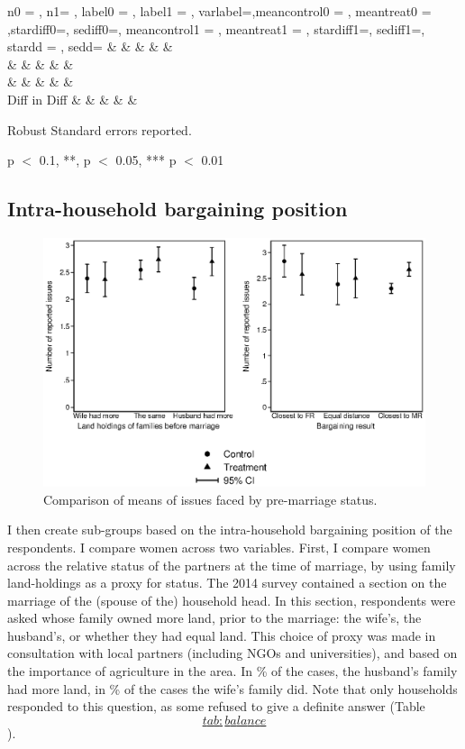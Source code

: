 \documentclass[
]{article}
\begin{document}
n0 = , n1= , label0 = , label1 = , varlabel=,meancontrol0 = , meantreat0
= ,stardiff0=, sediff0=, meancontrol1 = , meantreat1 = , stardiff1=,
sediff1=, stardd = , sedd= \& \& \& \& \&\\
\& \& \& \& \&\\
\& \& \& \& \&\\
Diff in Diff \& \& \& \& \&

Robust Standard errors reported.

p \(<\) 0.1, **, p \(<\) 0.05, *** p \(<\) 0.01

\subsection*{Intra-household bargaining
position}\label{intra-household-bargaining-position}

\begin{figure}
\centering
\includegraphics{figures/meancompare_mar.eps}
\caption{Comparison of means of issues faced by pre-marriage
status.}\label{fig:meancompare_mar}
\end{figure}

I then create sub-groups based on the intra-household bargaining
position of the respondents. I compare women across two variables.
First, I compare women across the relative status of the partners at the
time of marriage, by using family land-holdings as a proxy for status.
The 2014 survey contained a section on the marriage of the (spouse of
the) household head. In this section, respondents were asked whose
family owned more land, prior to the marriage: the wife's, the
husband's, or whether they had equal land. This choice of proxy was made
in consultation with local partners (including NGOs and universities),
and based on the importance of agriculture in the area. In \% of the
cases, the husband's family had more land, in \% of the cases the wife's
family did. Note that only households responded to this question, as
some refused to give a definite answer (Table
\hyperref[tab:balance]{\[tab:balance\]}).
\end{document}
